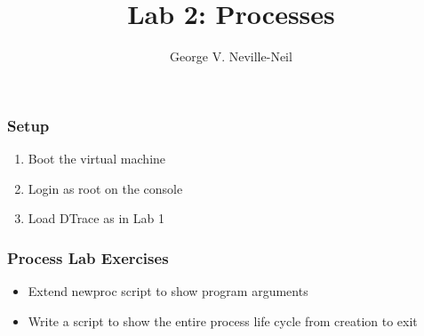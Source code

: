 \documentclass[pdftex]{beamer}
\begin{document}

\title{Lab 2: Processes}
\author[shortname]{George V. Neville-Neil}

\begin{frame}
  \frametitle{Setup}
  \begin{enumerate}
  \item Boot the virtual machine
  \item Login as root on the console
  \item Load DTrace as in Lab 1
  \end{enumerate}
\end{frame}

\begin{frame}[fragile]
  \frametitle{Process Lab Exercises}
  \begin{itemize}
  \item Extend newproc script to show program arguments
  \item Write a script to show the entire process life cycle from creation
    to exit
  \end{itemize}
\end{frame}
\end{document}
